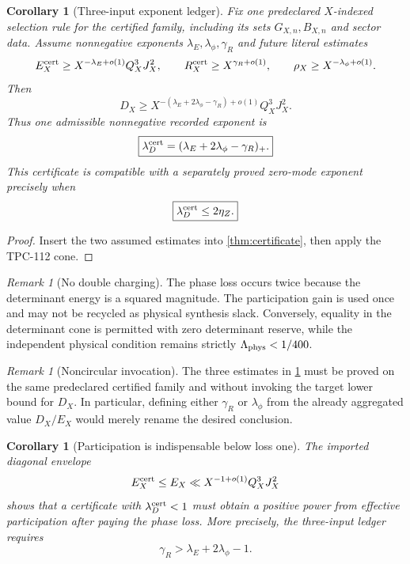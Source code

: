 \documentclass[11pt]{article}
\newtheorem{corollary}[theorem]{Corollary}
\theoremstyle{definition}
\theoremstyle{remark}
\newtheorem{remark}[theorem]{Remark}
\begin{document}
\begin{corollary}[Three-input exponent ledger]
\label{cor:ledger}
Fix one predeclared \(X\)-indexed selection rule for the certified
family, including its sets \(G_{X,n},B_{X,n}\) and sector data.
Assume nonnegative
exponents \(\lambda_E,\lambda_\phi,\gamma_R\) and future literal
estimates
\[
 E_X^{\rm cert}
 \ge X^{-\lambda_E+o(1)}Q_X^3J_X^2,
\qquad
 R_X^{\rm cert}\ge X^{\gamma_R+o(1)},
 \qquad
 \rho_X\ge X^{-\lambda_\phi+o(1)}.
\]
Then
\[
 D_X\ge
 X^{-(\lambda_E+2\lambda_\phi-\gamma_R)+o(1)}
 Q_X^3J_X^2.
\]
Thus one admissible nonnegative recorded exponent is
\[
 \boxed{
 \lambda_D^{\rm cert}
 =(\lambda_E+2\lambda_\phi-\gamma_R)_+.}
\]
This certificate is compatible with a separately proved zero-mode
exponent precisely when
\[
 \boxed{
 \lambda_D^{\rm cert}
 \le2\eta_Z.}
\]
\end{corollary}

\begin{proof}
Insert the two assumed estimates into \cref{thm:certificate}, then
apply the TPC-112 cone.
\end{proof}

\begin{remark}[No double charging]
The phase loss occurs twice because the determinant energy is a
squared magnitude.  The participation gain is used once and may not
be recycled as physical synthesis slack.  Conversely, equality in
the determinant cone is permitted with zero determinant reserve,
while the independent physical condition remains strictly
\(\Lambda_{\rm phys}<1/400\).
\end{remark}

\begin{remark}[Noncircular invocation]
The three estimates in \cref{cor:ledger} must be proved on the same
predeclared certified family and without invoking the target lower
bound for \(D_X\).  In particular, defining either
\(\gamma_R\) or \(\lambda_\phi\) from the already aggregated value
\(D_X/E_X\) would merely rename the desired conclusion.
\end{remark}

\begin{corollary}[Participation is indispensable below loss one]
\label{cor:participation}
The imported diagonal envelope
\[
 E_X^{\rm cert}\le E_X
 \ll X^{-1+o(1)}Q_X^3J_X^2
\]
shows that a certificate with
\(\lambda_D^{\rm cert}<1\) must obtain a positive
power from effective participation after paying the phase loss.  More
precisely, the three-input ledger requires
\[
 \gamma_R> \lambda_E+2\lambda_\phi-1.
\]
\end{corollary}
\end{document}
